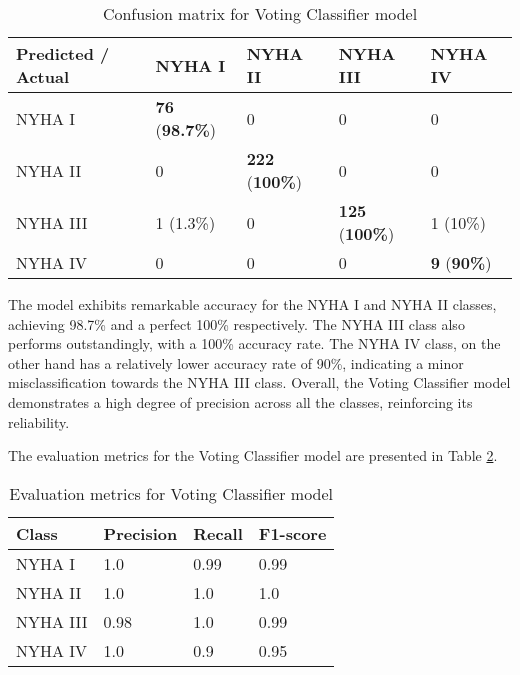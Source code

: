 \begin{table}[H]
  \centering
  \caption{Confusion matrix for Voting Classifier model}
  \label{tab:voting_classifier_confusion_matrix}
  \begin{tabular}{|p{3.5cm}|p{2.5cm}|p{2.5cm}|p{2.4cm}|p{1.8cm}|}
  \hline
  Predicted / Actual          & NYHA I       & NYHA II      & NYHA III    & NYHA IV  \\ \hline
  NYHA I                      & \textbf{76} (\textbf{98.7\%}) & 0  & 0 & 0        \\ \hline
  NYHA II                     & 0 & \textbf{222} (\textbf{100\%}) & 0 & 0        \\ \hline
  NYHA III                    & 1 (1.3\%) & 0  & \textbf{125} (\textbf{100\%}) & 1 (10\%) \\ \hline
  NYHA IV                     & 0            & 0            & 0           & \textbf{9} (\textbf{90\%}) \\ \hline
  \end{tabular}
\end{table}

The model exhibits remarkable accuracy for the NYHA I and NYHA II classes, achieving 98.7\% and a perfect 100\% respectively. The NYHA III class also performs outstandingly, with a 100\% accuracy rate. The NYHA IV class, on the other hand has a relatively lower accuracy rate of 90\%, indicating a minor misclassification towards the NYHA III class. Overall, the Voting Classifier model demonstrates a high degree of precision across all the classes, reinforcing its reliability.

The evaluation metrics for the Voting Classifier model are presented in Table \ref{tab:metrics voting classifier}.

\begin{table}[H]
  \centering
  \caption{Evaluation metrics for Voting Classifier model}
  \label{tab:metrics voting classifier}
  \begin{tabular}{|p{2cm}|p{2cm}|p{1.5cm}|p{2cm}|}
  \hline
  \textbf{Class} & \textbf{Precision} & \textbf{Recall} & \textbf{F1-score} \\ \hline
  NYHA I         & 1.0               & 0.99            & 0.99              \\ 
  NYHA II        & 1.0               & 1.0            & 1.0              \\ 
  NYHA III       & 0.98               & 1.0            & 0.99              \\
  NYHA IV        & 1.0                & 0.9             & 0.95              \\ \hline
  \end{tabular}
\end{table}

